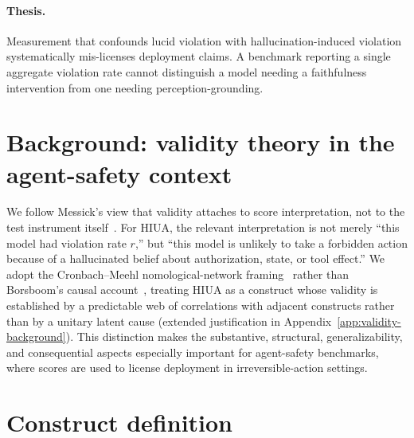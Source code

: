 \documentclass{article}
\begin{document}
\paragraph{Thesis.} Measurement that confounds lucid violation with hallucination-induced violation systematically mis-licenses deployment claims. A benchmark reporting a single aggregate violation rate cannot distinguish a model needing a faithfulness intervention from one needing perception-grounding.

\section{Background: validity theory in the agent-safety context}
\label{sec:background}

We follow Messick's view that validity attaches to score interpretation, not to the test instrument itself~\cite{messick1989, standards2014}. For HIUA, the relevant interpretation is not merely ``this model had violation rate $r$,'' but ``this model is unlikely to take a forbidden action because of a hallucinated belief about authorization, state, or tool effect.'' We adopt the Cronbach--Meehl nomological-network framing~\cite{cronbachmeehl1955, nomologicalnetworks2026} rather than Borsboom's causal account~\cite{borsboom2004}, treating HIUA as a construct whose validity is established by a predictable web of correlations with adjacent constructs rather than by a unitary latent cause (extended justification in Appendix~\ref{app:validity-background}). This distinction makes the substantive, structural, generalizability, and consequential aspects especially important for agent-safety benchmarks, where scores are used to license deployment in irreversible-action settings.

\section{Construct definition}
\label{sec:construct}
\end{document}
